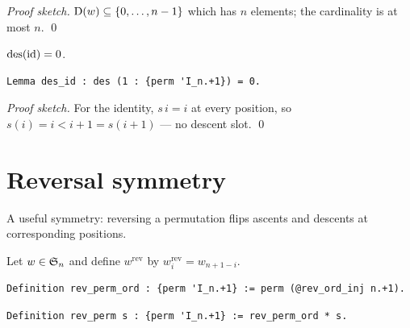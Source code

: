 \noindent
\emph{Proof sketch.} $\mathrm{D}(w) \subseteq \{0, \dots, n-1\}$ which
has $n$ elements; the cardinality is at most $n$. \qed

\begin{lemma}
  \label{lem:des_id}
  $\mathrm{des}(\mathrm{id}) = 0$.
\end{lemma}

\begin{lstlisting}[language=Rocq]
Lemma des_id : des (1 : {perm 'I_n.+1}) = 0.
\end{lstlisting}


\noindent
\emph{Proof sketch.} For the identity, $s\,i = i$ at every position,
so $s(i) = i < i+1 = s(i+1)$ --- no descent slot. \qed

\section{Reversal symmetry}
\label{sec:reversal}

A useful symmetry: reversing a permutation flips ascents and
descents at corresponding positions.

\begin{definition}
  \label{def:rev_perm}
  Let $w \in \mathfrak{S}_{n}$ and define $w^{\mathrm{rev}}$ by
  $w^{\mathrm{rev}}_i = w_{n+1-i}$.
\end{definition}

\begin{lstlisting}[language=Rocq]
Definition rev_perm_ord : {perm 'I_n.+1} := perm (@rev_ord_inj n.+1).
\end{lstlisting}


\begin{lstlisting}[language=Rocq]
Definition rev_perm s : {perm 'I_n.+1} := rev_perm_ord * s.
\end{lstlisting}


